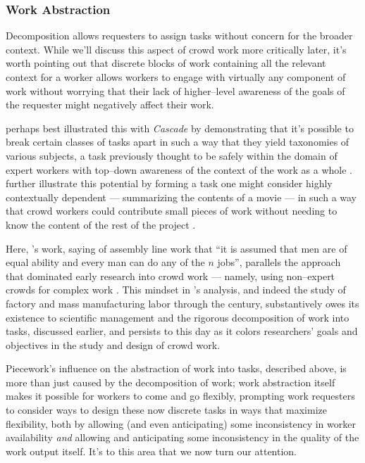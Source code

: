 \documentclass[trackingWork]{subfiles}
\begin{document}
{\subsubsection{Work Abstraction}\label{sec:workAbstraction}
Decomposition allows requesters to assign tasks without concern for the broader context.
While we'll discuss this aspect of crowd work more critically later,
it's worth pointing out that discrete blocks of work containing all the relevant context for a worker
allows workers to engage with virtually any component of work without worrying that their lack of 
higher--level awareness of the goals of the requester might negatively affect their work.

\citeauthor{chilton2013cascade} perhaps best illustrated this with
\textit{Cascade} by demonstrating that it's possible to
break certain classes of tasks apart
in such a way that they yield taxonomies of various subjects,
a task previously thought to be safely within the domain of expert workers
with top--down awareness of the context of the work as a whole
\cite{chilton2013cascade}.
\citeauthor{verroios2014context} further illustrate this potential by
forming a task one might consider highly contextually dependent
--- summarizing the contents of a movie ---
in such a way that crowd workers could contribute small pieces of work without
needing to know the content of the rest of the project
\cite{verroios2014context}.

Here, \citeauthor{hu1961parallel}'s work,
saying of assembly line work that
``it is assumed that men are of equal ability and every man can do any of the $n$ jobs'',
parallels the approach that dominated early research into crowd work
--- namely, using non--expert crowds for complex work
\cite{hu1961parallel}.
This mindset in \citeauthor{hu1961parallel}'s analysis,
and indeed the study of factory and mass manufacturing labor through the  century,
substantively owes its existence to scientific management
and the rigorous decomposition of work into tasks, discussed earlier,
and persists to this day as it colors
researchers' goals and objectives in the study and design of crowd work.

Piecework's influence on the abstraction of work into tasks,
described above, is more than just caused by the decomposition of work;
work abstraction itself makes it possible for workers to come and go flexibly,
prompting work requesters to consider ways to design these now discrete tasks in ways that
maximize flexibility, both by allowing (and even anticipating) some inconsistency in worker availability
\textit{and} allowing and anticipating some inconsistency in the quality of the work output itself.
It's to this area that we now turn our attention.

}
\end{document}

